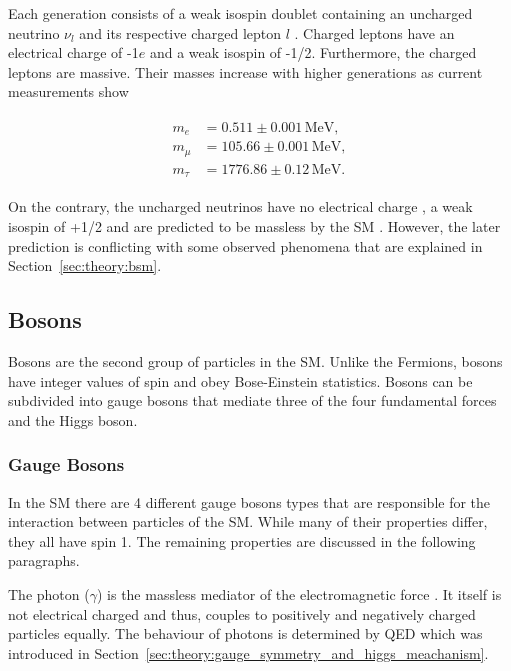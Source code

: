 \documentclass[bachelor,ngerman,english]{GAUBM}
\begin{document}
Each generation consists of a weak isospin doublet containing an uncharged neutrino $\nu_l$ and its respective charged lepton $l$ \cite{theory:general_sm}. Charged leptons have an electrical charge of -1$e$ and a weak isospin of -1/2. Furthermore, the charged leptons are massive. Their masses increase with higher generations as current measurements \cite{pdg} show

\begin{gather}
    \begin{aligned}
        m_e     &=0.511\pm0.001\,\text{MeV},\\
        m_\mu   &=105.66\pm0.001\,\text{MeV},\\
        m_\tau  &=1776.86\pm0.12\,\text{MeV}.
        \label{eq:mass_leptons}
    \end{aligned}
\end{gather}

On the contrary, the uncharged neutrinos have no electrical charge \cite{pdg}, a weak isospin of +1/2 and are predicted to be massless by the SM \cite{theory:general_sm}. However, the later prediction is conflicting with some observed phenomena that are explained in Section~\ref{sec:theory:bsm}.


\subsection*{Bosons}
Bosons are the second group of particles in the SM. Unlike the Fermions, bosons have integer values of spin and obey Bose-Einstein statistics. Bosons can be subdivided into gauge bosons that mediate three of the four fundamental forces and the Higgs boson. %

\subsubsection*{Gauge Bosons}
In the SM there are 4 different gauge bosons types \cite{theory:general_sm} that are responsible for the interaction between particles of the SM. While many of their properties differ, they all have spin 1. The remaining properties are discussed in the following paragraphs.  

The photon ($\gamma$) is the massless mediator of the electromagnetic force \cite{theory:qed_02,theory:qed_04,theory:qed_05}. It itself is not electrical charged and thus, couples to positively and negatively charged particles equally. The behaviour of photons is determined by QED which was introduced in Section~\ref{sec:theory:gauge_symmetry_and_higgs_meachanism}.
\end{document}
